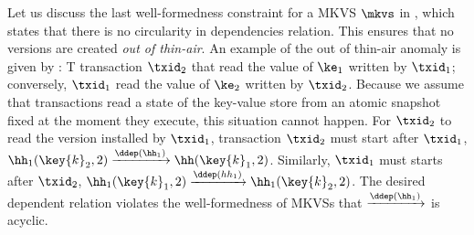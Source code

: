 
Let us discuss the last well-formedness constraint for a MKVS \( \mkvs \) in , which states that there is no circularity in dependencies relation.
This ensures that no versions are created \emph{out of thin-air}.
An example of the out of thin-air anomaly is given by : 
T transaction $\txid_2$ that read the value of $\ke_1$ written by $\txid_1$;
conversely, $\txid_1$ read the value of $\ke_2$ written by $\txid_2$. 
Because we assume that transactions read a state of the key-value store from an atomic snapshot fixed at the moment they execute, this situation cannot happen. 
For $\txid_2$ to read the version installed by $\txid_1$, transaction $\txid_2$ must start after $\txid_1$, \ie \( \hh_1(\key{k}_2, 2) \xrightarrow{\ddep(\hh_1)} \hh(\key{k}_1, 2) \).
Similarly, $\txid_1$ must starts after $\txid_2$, \ie \( \hh_1(\key{k}_1, 2) \xrightarrow{\ddep(hh_1)} \hh_1(\key{k}_2, 2) \).
The desired dependent relation violates the well-formedness of MKVSs that $\xrightarrow{\ddep(\hh_1)}$ is acyclic. 

